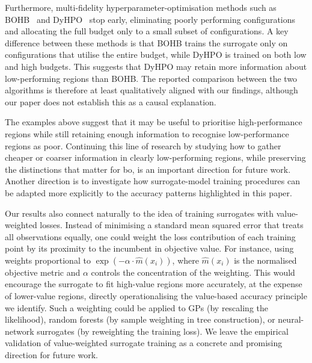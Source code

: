 {Furthermore, multi-fidelity hyperparameter-optimisation methods such as BOHB~\citep{FalEtAl2018} and DyHPO~\citep{WisEtAl22} stop early, eliminating poorly performing configurations and allocating the full budget only to a small subset of configurations. A key difference between these methods is that BOHB trains the surrogate only on configurations that utilise the entire budget, while DyHPO is trained on both low and high budgets. This suggests that DyHPO may retain more information about low-performing regions than BOHB. The reported comparison between the two algorithms is therefore at least qualitatively aligned with our findings, although our paper does not establish this as a causal explanation.

The examples above suggest that it may be useful to prioritise high-performance regions while still retaining enough information to recognise low-performance regions as poor. Continuing this line of research by studying how to gather cheaper or coarser information in clearly low-performing regions, while preserving the distinctions that matter for \gls{bo}, is an important direction for future work. Another direction is to investigate how surrogate-model training procedures can be adapted more explicitly to the accuracy patterns highlighted in this paper.

Our results also connect naturally to the idea of training surrogates with value-weighted losses. Instead of minimising a standard mean squared error that treats all observations equally, one could weight the loss contribution of each training point by its proximity to the incumbent in objective value. For instance, using weights proportional to $\exp(-\alpha \cdot \hat{m}(x_i))$, where $\hat{m}(x_i)$ is the normalised objective metric and $\alpha$ controls the concentration of the weighting. This would encourage the surrogate to fit high-value regions more accurately, at the expense of lower-value regions, directly operationalising the value-based accuracy principle we identify. Such a weighting could be applied to GPs (by rescaling the likelihood), random forests (by sample weighting in tree construction), or neural-network surrogates (by reweighting the training loss). We leave the empirical validation of value-weighted surrogate training as a concrete and promising direction for future work.

}
